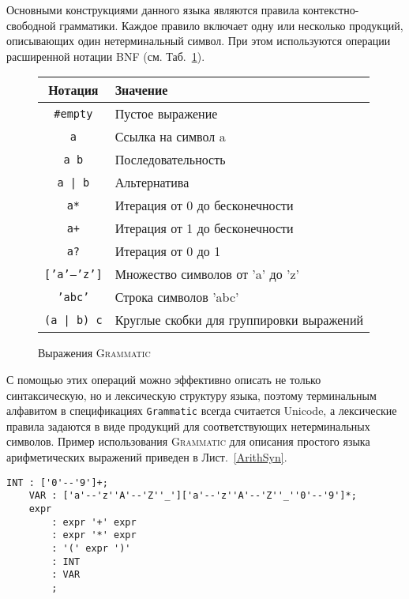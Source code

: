 \documentclass[12pt,a4paper]{article}
\newcommand{\lstref}[1]{Лист.~\ref{#1}}
\newcommand{\tabref}[1]{Таб.~\ref{#1}}
\newcommand{\code}[1]{\mbox{\texttt{#1}}}
\newcommand{\tool}[1]{\textsc{#1}}
\begin{document}
Основными конструкциями данного языка являются правила контекстно-свободной грамматики. Каждое правило включает одну или несколько продукций, описывающих один нетерминальный символ. При этом используются операции расширенной нотации BNF (см. \tabref{operations}). 
\begin{figure}[htbp]
\center
	\begin{tabular}{|c|l|}
	\hline
	\bf Нотация & \bf Значение \\
	\hline
	\code{\#empty} & Пустое выражение \\
	\code{a} & Ссылка на символ a \\
	\code{a b} & Последовательность \\
	\code{a | b} & Альтернатива \\
	\code{a*} & Итерация от 0 до бесконечности \\
	\code{a+} & Итерация от 1 до бесконечности \\
	\code{a?} & Итерация от 0 до 1 \\
	\code{['a'--'z']} & Множество символов от 'a' до 'z' \\
	\code{'abc'} & Строка символов 'abc' \\
	\code{(a | b) c} & Круглые скобки для группировки выражений \\
	\hline
	\end{tabular}
	\caption{Выражения \tool{Grammatic}}\label{operations}
\end{figure}
С помощью этих операций можно эффективно описать не только синтаксическую, но и лексическую структуру языка, поэтому терминальным алфавитом в спецификациях \code{Grammatic} всегда считается Unicode, а лексические правила задаются в виде продукций для соответствующих нетерминальных символов. Пример использования \tool{Grammatic} для описания простого языка арифметических выражений приведен в \lstref{ArithSyn}.
\begin{lstlisting}[float=htbp,label=ArithSyn,caption=Синтаксис языка арифметических выражений]
	INT : ['0'--'9']+;
	VAR : ['a'--'z''A'--'Z''_']['a'--'z''A'--'Z''_''0'--'9']*;
	expr
		: expr '+' expr
		: expr '*' expr
		: '(' expr ')'
		: INT
		: VAR
		;
\end{lstlisting}
\end{document}
